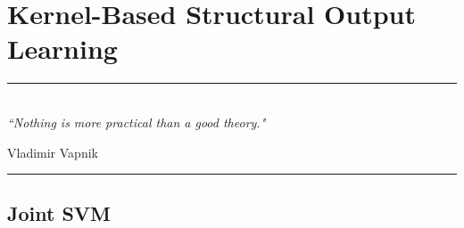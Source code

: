 
\chapter{Kernel-Based Structural Output Learning} %
\label{Chapter4} %

\rule{\textwidth}{0.4pt} \\[0.5cm]
\textit{``Nothing is more practical than a good theory."}

\begin{flushright}
Vladimir Vapnik
\end{flushright}
\rule{\textwidth}{0.4pt} 



\section{Joint SVM}

